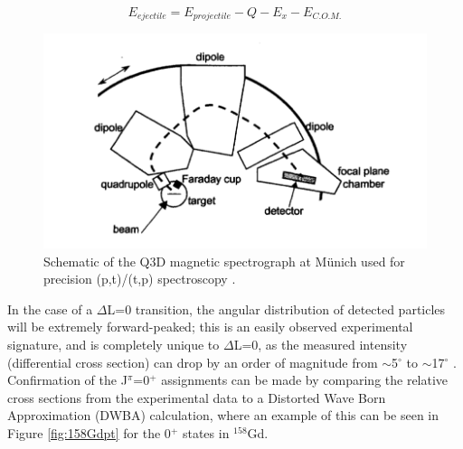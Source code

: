 \begin{equation}\label{eq:Q3D_E}
E_{ejectile}=E_{projectile}-Q-E_x-E_{C.O.M.}
\end{equation}

\begin{figure}[ht]
\begin{center}
\includegraphics[width=\textwidth]{Q3D_spectrometer.png}
\caption{Schematic of the Q3D magnetic spectrograph at M\"{u}nich used for precision (p,t)/(t,p) spectroscopy \cite{Meyer_thesis}.}
\label{fig:Q3D}
\end{center}
\end{figure}


In the case of a $\Delta$L=0 transition, the angular distribution of detected particles will be extremely forward-peaked; this is an easily observed experimental signature, and is completely unique to $\Delta$L=0, as the measured intensity (differential cross section) can drop by an order of magnitude from $\sim$5$^\circ$ to $\sim$17$^\circ$ \cite{Meyer_pt0_2006}. Confirmation of the J$^\pi$=0$^+$ assignments can be made by comparing the relative cross sections from the experimental data to a Distorted Wave Born Approximation (DWBA) calculation, where an example of this can be seen in Figure \ref{fig:158Gdpt} for the 0$^+$ states in $^{158}$Gd.

